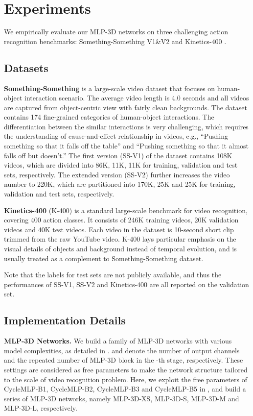 \documentclass[10pt,twocolumn,letterpaper]{article}
\begin{document}
\section{Experiments}
We empirically evaluate our MLP-3D networks on three challenging action recognition benchmarks:
Something-Something V1\&V2 \cite{Goyal2017TheS} and Kinetics-400 \cite{carreira2017quo}.

\subsection{Datasets}
\textbf{Something-Something} is a large-scale video dataset that focuses on human-object interaction scenario. The average video length is 4.0 seconds and all videos are captured from object-centric view with fairly clean backgrounds. The dataset contains 174 fine-grained categories of human-object interactions. The differentiation between the similar interactions is very challenging, which requires the understanding of cause-and-effect relationship in videos, e.g., ``Pushing something so that it falls off the table'' and ``Pushing something so that it almost falls off but doesn't.'' The first version (SS-V1) of the dataset contains 108K videos, which are divided into 86K, 11K, 11K for training, validation and test sets, respectively. The extended version (SS-V2) further increases the video number to 220K, which are partitioned into 170K, 25K and 25K for training, validation and test sets, respectively.

\textbf{Kinetics-400} (K-400) is a standard large-scale benchmark for video recognition, covering 400 action classes. It consists of 246K training videos, 20K validation videos and 40K test videos. Each video in the dataset is 10-second short clip trimmed from the raw YouTube video. K-400 lays particular emphasis on the visual details of objects and background instead of temporal evolution, and is usually treated as a complement to Something-Something dataset.

Note that the labels for test sets are not publicly available, and thus the performances of SS-V1, SS-V2 and Kinetics-400 are all reported on the validation set.

\subsection{Implementation Details}
\textbf{MLP-3D Networks.}
We build a family of MLP-3D networks with various model complexities, as detailed in .  and  denote the number of output channels and the repeated number of MLP-3D block in the -th stage, respectively. These settings are considered as free parameters to make the network structure tailored to the scale of video recognition problem. Here, we exploit the free parameters of CycleMLP-B1, CycleMLP-B2, CycleMLP-B3 and CycleMLP-B5 in \cite{chen2021cyclemlp}, and build a series of MLP-3D networks, namely MLP-3D-XS, MLP-3D-S, MLP-3D-M and MLP-3D-L, respectively.
\end{document}
